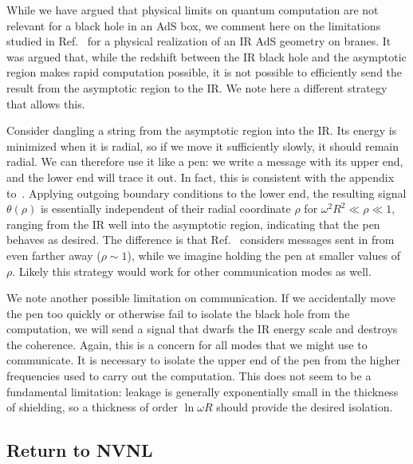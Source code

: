 \documentclass[12pt]{article}
\begin{document}
{While we have argued that physical limits on quantum computation are not relevant for a black hole in an AdS box, we comment here on the limitations studied in Ref.~\cite{Harlow:2013tf} for a physical realization of an IR  AdS geometry on branes.  It was argued that, while the redshift between the IR black hole and the asymptotic region makes rapid computation possible, it is not possible to efficiently send the result  from the asymptotic region  to the IR.  We note here a different strategy that allows this.

Consider dangling a string from the asymptotic region into the IR. {Its energy is minimized when it is radial, so if we} move it sufficiently slowly, it should remain radial.  We can therefore use it like a pen: we write a message with its upper end, and the lower end will trace it out.  {In fact, this is consistent with the appendix to~\cite{Harlow:2013tf}. Applying} outgoing boundary conditions to the lower end, the resulting signal $\theta(\rho)$ is essentially independent of their radial coordinate $\rho$ for $\omega^2 R^2 \ll \rho \ll 1$, ranging from the IR well into the asymptotic region, indicating that the pen behaves as desired.  The difference is that Ref.~\cite{Harlow:2013tf} considers messages sent in from even farther away ($\rho \sim 1$), while we imagine holding the pen at smaller values of $\rho.$  Likely this strategy would work for other communication modes as well.

We note another possible limitation on communication.  If we accidentally move the pen too quickly or otherwise fail to isolate the black hole from the computation, we will send a signal that dwarfs the IR energy scale and destroys the coherence. Again, this is a concern for all modes that we might use to communicate.  It is necessary to isolate the upper end of the pen from the higher frequencies used to carry out the computation.
This does not seem to be a fundamental limitation:
leakage is generally exponentially small in the thickness of shielding, so a thickness of order $\ln \omega R$ should provide the desired isolation.

\subsection{Return to NVNL}
\label{RNL}

}
\end{document}
